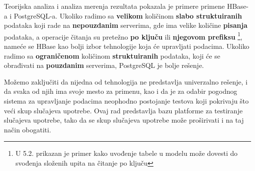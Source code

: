 \documentclass[12pt,oneside]{memoir}
\begin{document}
Teorijska analiza i analiza merenja rezultata pokazala je primere primene HBase-a i PostgreSQL-a. Ukoliko radimo sa \textbf{velikom} količinom \textbf{slabo struktuiranih} podataka koji rade na \textbf{nepouzdanim} serverima, gde ima velike količine \textbf{pisanja} podataka, a operacije čitanja su pretežno \textbf{po ključu} ili \textbf{njegovom prefiksu} \footnote{U 5.2. prikazan je primer kako uvođenje tabele u modelu može dovesti do svođenja složenih upita na čitanje po ključu}, nameće se HBase kao bolji izbor tehnologije koja će upravljati podacima. Ukoliko radimo sa \textbf{ograničenom} količinom \textbf{struktuiranih} podataka, koji će se obrađivati na \textbf{pouzdanim} serverima, PostgreSQL je bolje rešenje.

Možemo zaključiti da nijedna od tehnologija ne predstavlja univerzalno rešenje, i da svaka od njih ima svoje mesto za primenu, kao i da je za odabir pogodnog sistema za upravljanje podacima neophodno postojanje testova koji pokrivaju što veći skup slučajeva upotrebe. Ovaj rad predstavlja bazu platforme za testiranje slučajeva upotrebe, tako da se skup slučajeva upotrebe može proširivati i na taj način obogatiti.



\literatura

\backmatter

\end{document}
